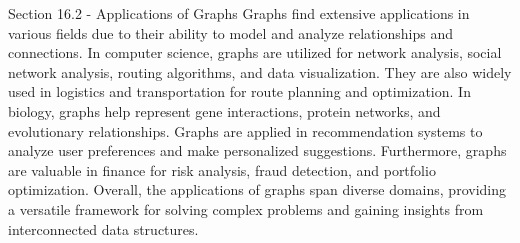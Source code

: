 \begin{notes}{Section 16.2 - Applications of Graphs}
    Graphs find extensive applications in various fields due to their ability to model and analyze relationships and connections. In computer science, graphs are utilized for network analysis, social network 
    analysis, routing algorithms, and data visualization. They are also widely used in logistics and transportation for route planning and optimization. In biology, graphs help represent gene interactions, 
    protein networks, and evolutionary relationships. Graphs are applied in recommendation systems to analyze user preferences and make personalized suggestions. Furthermore, graphs are valuable in finance 
    for risk analysis, fraud detection, and portfolio optimization. Overall, the applications of graphs span diverse domains, providing a versatile framework for solving complex problems and gaining insights 
    from interconnected data structures.
\end{notes}

